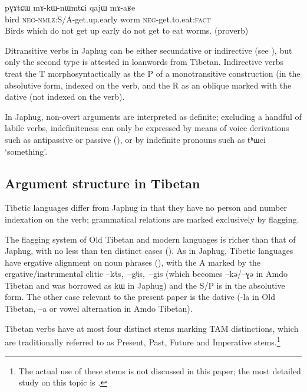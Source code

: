 \documentclass[oldfontcommands,oneside,a4paper,11pt]{article}
\newcommand{\ipa}[1]{{\phon \mbox{#1}}} %
\begin{document}
\begin{exe}
\ex \label{ex:maRe}
\gll
\ipa{pɣɤtɕɯ}  	\ipa{mɤ-kɯ-nɯmtɕi}  	\ipa{qajɯ}  	\ipa{mɤ-aʁe}  \\
bird \textsc{neg-nmlz}:S/A-get.up.early worm \textsc{neg}-get.to.eat:\textsc{fact} \\
\glt Birds which do not get up early do not get to eat worms. (proverb) 
\end{exe}  

Ditransitive verbs in Japhug can be either secundative or indirective (see \citealt{jacques14antipassive}), but only the second type is attested in loanwords from Tibetan. Indirective verbs treat the T morphosyntactically as the P of a monotransitive construction (in the absolutive form, indexed on the verb, and the R as an oblique marked with the dative (not indexed on the verb).

In Japhug, non-overt arguments are interpreted as definite; excluding a handful of labile verbs, indefiniteness can only be expressed by means of voice derivations such as antipassive or passive (\citealt{jacques12demotion}), or by indefinite pronouns such as \ipa{tʰɯci} `something'.

\subsection{Argument structure in Tibetan}
Tibetic languages differ from Japhug in that they have no person and number indexation on the verb; grammatical relations are marked exclusively by flagging.

The flagging system of Old Tibetan and modern languages is richer than that of Japhug,  with no less than ten distinct cases (\citet{tournadre10cases, hill12bas}). As in Japhug, Tibetic languages have ergative alignment on noun phrases (\citealt{tournadre96erg}), with the A marked by the ergative/instrumental clitic \ipa{--kʲis, --gʲis, --gis} (which becomes \ipa{--kə/--ɣə} in Amdo Tibetan and was borrowed as \ipa{kɯ} in Japhug) and the S/P is in the absolutive form. The other case relevant to the present paper is the dative (\ipa{-la} in Old Tibetan, \ipa{--a} or vowel alternation in Amdo Tibetan).


Tibetan verbs have at most four distinct stems marking TAM distinctions, which are traditionally referred to as Present, Past, Future and Imperative stems.\footnote{The actual use of these stems is not discussed in this paper; the most detailed study on this topic is \citealt{zeisler04}.} 
\end{document}
